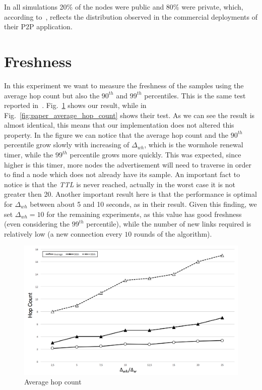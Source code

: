 In all simulations 20\% of the nodes were public and 80\% were private, which, according to~\cite{wormhole}, reflects the distribution observed in the commercial deployments of their P2P application.

\section{Freshness}
\label{sec:eval_freshness}
In this experiment we want to measure the freshness of the samples using the average hop count but also the \textit{$90^{th}$} and \textit{$99^{th}$} percentiles. This is the same test reported in~\cite{wormhole}. Fig.~\ref{fig:my_average_hop_count} shows our result, while in Fig.~\ref{fig:paper_average_hop_count} shows their test. As we can see the result is almost identical, this means that our implementation does not altered this property. In the figure we can notice that the average hop count and the $90^{th}$ percentile grow slowly with increasing of $\Delta_{wh}$, which is the wormhole renewal timer, while the $99^{th}$ percentile grows more quickly. This was expected, since higher is this timer, more nodes the advertisement will need to traverse in order to find a node which does not already have its sample. An important fact to notice is that the \textit{TTL} is never reached, actually in the worst case it is not greater then 20. Another important result here is that the performance is optimal for $\Delta_{wh}$  between about 5 and 10 seconds, as in their result. Given this finding, we set $\Delta_{wh} = 10$ for the remaining experiments, as this value has good freshness (even considering the $99^{th}$ percentile), while the number of new links required is relatively low (a new connection every $10$ rounds of the algorithm). 

\begin{figure}[ht]
  \centering
  \includegraphics[keepaspectratio=true, width=\textwidth]{images/average_hop_count}\caption{Average hop count}
  \label{fig:my_average_hop_count}
\end{figure}

